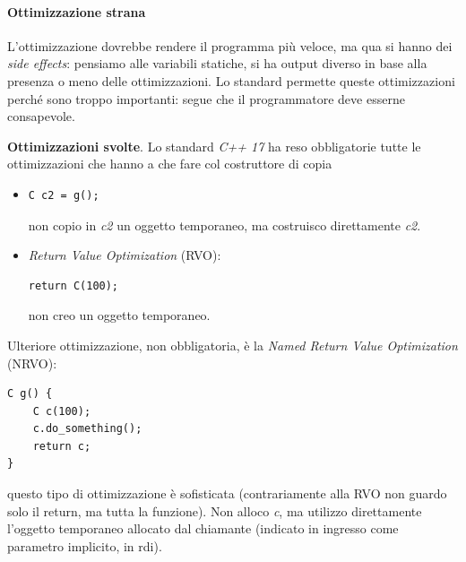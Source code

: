 \documentclass[11pt]{report}
\theoremstyle{definition}
\begin{document}
\paragraph{Ottimizzazione strana}  L'ottimizzazione dovrebbe rendere il programma più veloce, ma qua si hanno dei \emph{side effects}: pensiamo alle variabili statiche, si ha output diverso in base alla presenza o meno delle ottimizzazioni. Lo standard permette queste ottimizzazioni perché sono troppo importanti: segue che il programmatore deve esserne consapevole.
\begin{framed}\noindent \textbf{Ottimizzazioni svolte}. Lo standard \emph{C++ 17} ha reso obbligatorie tutte le ottimizzazioni che hanno a che fare col costruttore di copia
\begin{itemize}
\item \begin{verbatim}
C c2 = g();
\end{verbatim}
non copio in \emph{c2} un oggetto temporaneo, ma costruisco direttamente \emph{c2}.
\item \emph{Return Value Optimization} (RVO):
\begin{verbatim}
return C(100);
\end{verbatim}
non creo un oggetto temporaneo.
\end{itemize}
Ulteriore ottimizzazione, non obbligatoria, è la \emph{Named Return Value Optimization} (NRVO):
\begin{verbatim}
C g() {
    C c(100);
    c.do_something();
    return c;
}
\end{verbatim}
questo tipo di ottimizzazione è sofisticata (contrariamente alla RVO non guardo solo il return, ma tutta la funzione). Non alloco \emph{c}, ma utilizzo direttamente l'oggetto temporaneo allocato dal chiamante (indicato in ingresso come parametro implicito, in rdi). 
\end{framed}
\clearpage 
\end{document}
